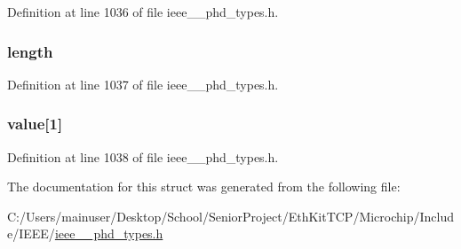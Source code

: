 Definition at line 1036 of file ieee\+\_\+\_\+phd\+\_\+types.\+h.

\hypertarget{struct___h_a_n_d_l_e_list_a3743679e4ff85e3e1b3fc2e59973fbb3}{}
\subsubsection[{length}]{ length}\label{struct___h_a_n_d_l_e_list_a3743679e4ff85e3e1b3fc2e59973fbb3}


Definition at line 1037 of file ieee\+\_\+\_\+phd\+\_\+types.\+h.

\hypertarget{struct___h_a_n_d_l_e_list_a7af628899ae1889349ae5fa82741c483}{}
\subsubsection[{value}]{ value\mbox{[}1\mbox{]}}\label{struct___h_a_n_d_l_e_list_a7af628899ae1889349ae5fa82741c483}


Definition at line 1038 of file ieee\+\_\+\_\+phd\+\_\+types.\+h.



The documentation for this struct was generated from the following file\+:\begin{DoxyCompactItemize}
\item 
C\+:/\+Users/mainuser/\+Desktop/\+School/\+Senior\+Project/\+Eth\+Kit\+T\+C\+P/\+Microchip/\+Include/\+I\+E\+E\+E/\hyperlink{ieee__11073__phd__types_8h}{ieee\+\_\+\_\+phd\+\_\+types.\+h}\end{DoxyCompactItemize}
